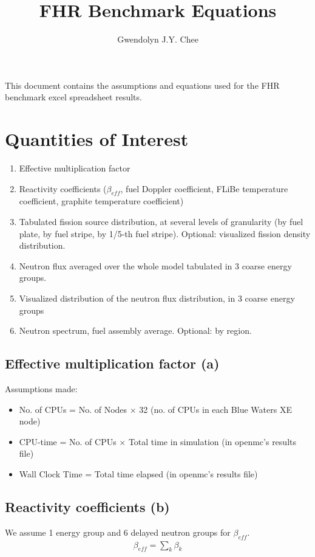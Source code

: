 \documentclass[letterpaper,11pt]{article}
\author{Gwendolyn J.Y. Chee}
\title{FHR Benchmark Equations }
\begin{document}
\maketitle
\hrulefill
\onehalfspacing

This document contains the assumptions and equations used for the FHR 
benchmark excel spreadsheet results. 

\section{Quantities of Interest}
\begin{enumerate}[label=(\alph*)]
    \item Effective multiplication factor 
    \item Reactivity coefficients ($\beta_{eff}$, fuel Doppler coefficient, FLiBe 
    temperature coefficient, graphite temperature coefficient)
    \item Tabulated fission source distribution, at several levels of granularity 
    (by fuel plate, by fuel stripe, by 1/5-th fuel stripe). Optional: visualized fission 
    density distribution.
    \item Neutron flux averaged over the whole model tabulated in 3 coarse energy groups. 
    \item Visualized distribution of the neutron flux distribution, in 3 coarse energy groups
    \item Neutron spectrum, fuel assembly average. Optional: by region.
\end{enumerate}

\subsection{Effective multiplication factor (a)}
Assumptions made: 
\begin{itemize}
    \item No. of CPUs = No. of Nodes $\times$ 32 (no. of CPUs in each Blue Waters XE node)
    \item CPU-time = No. of CPUs $\times$ Total time in simulation (in openmc's results file)
    \item Wall Clock Time = Total time elapsed (in openmc's results file)
\end{itemize}

\subsection{Reactivity coefficients (b)}
We assume 1 energy group and 6 delayed neutron groups for $\beta_{eff}$. 
\begin{align*}
    \beta_{eff} = \sum_k \beta_k
\end{align*}
\end{document}
